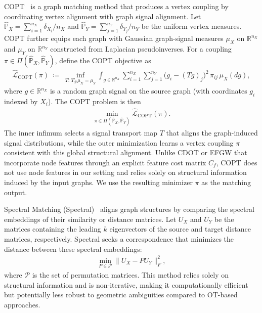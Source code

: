 \documentclass{article}
\theoremstyle{plain}
\theoremstyle{definition}
\theoremstyle{remark}
\begin{document}
COPT~\citep{dong2020copt} is a graph matching method that produces a vertex coupling by coordinating vertex alignment with graph signal alignment.
Let $\hat{\mathbb{P}}_X=\sum_{i=1}^{n_X}\delta_{X_i}/n_X$ and $\hat{\mathbb{P}}_Y=\sum_{j=1}^{n_Y}\delta_{Y_j}/n_Y$ be the uniform vertex measures.
COPT further equips each graph with Gaussian graph-signal measures $\mu_X$ on $\mathbb{R}^{n_X}$ and $\mu_Y$ on $\mathbb{R}^{n_Y}$ constructed from Laplacian pseudoinverses.
For a coupling $\pi\in\Pi(\hat{\mathbb{P}}_X,\hat{\mathbb{P}}_Y)$, define the COPT objective as
\begin{align*}
	\hat{\mathcal{L}}_{\mathrm{COPT}}(\pi)
	\;\coloneqq\;
	\inf_{T:\,T_{\#}\mu_X=\mu_Y}
	\int_{g \in \mathbb{R}^{n_X}}
	\sum_{i=1}^{n_X}\sum_{j=1}^{n_Y}\big(g_i-(Tg)_j\big)^2\,\pi_{ij}\,\mu_X(dg),
\end{align*}
where $g\in\mathbb{R}^{n_X}$ is a random graph signal on the source graph (with coordinates $g_i$ indexed by $X_i$).
The COPT problem is then
\begin{align*}
	\min_{\pi\in\Pi(\hat{\mathbb{P}}_X,\hat{\mathbb{P}}_Y)} \hat{\mathcal{L}}_{\mathrm{COPT}}(\pi).
\end{align*}
The inner infimum selects a signal transport map $T$ that aligns the graph-induced signal distributions, while the outer minimization learns a vertex coupling $\pi$ consistent with this global structural alignment.
Unlike CDOT or EFGW that incorporate node features through an explicit feature cost matrix $C_f$, COPT does not use node features in our setting and relies solely on structural information induced by the input graphs.
We use the resulting minimizer $\pi$ as the matching output.


Spectral Matching (Spectral)~\citep{leordeanu2005spectral} aligns graph structures by comparing the spectral embeddings of their similarity or distance matrices. Let $U_X$ and $U_Y$ be the matrices containing the leading $k$ eigenvectors of the source and target distance matrices, respectively. Spectral seeks a correspondence that minimizes the distance between these spectral embeddings:
\begin{align*}
	\min_{P \in \mathcal{P}} \| U_X - P U_Y \|_F^2 ,
\end{align*}
where $\mathcal{P}$ is the set of permutation matrices. This method relies solely on structural information and is non-iterative, making it computationally efficient but potentially less robust to geometric ambiguities compared to OT-based approaches. 
\end{document}
